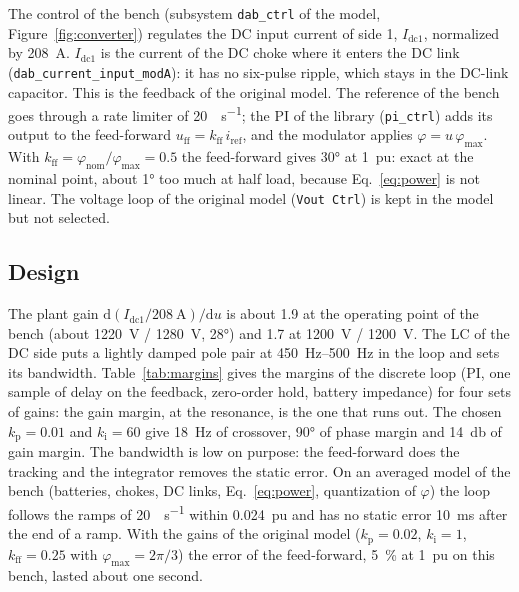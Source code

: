 \documentclass[12pt,a4paper]{scrartcl}
\newcommand{\ped}[1]{_{\mathrm{#1}}}
\newcommand{\code}[1]{\texttt{#1}}
\begin{document}
\begin{onehalfspace}
The control of the bench (subsystem \code{dab\_ctrl} of the model, Figure~\ref{fig:converter}) regulates the DC input current of side 1, $I\ped{dc1}$, normalized by \SI{208}{\ampere}. $I\ped{dc1}$ is the current of the DC choke where it enters the DC link (\code{dab\_current\_input\_modA}): it has no six-pulse ripple, which stays in the DC-link capacitor. This is the feedback of the original model. The reference of the bench goes through a rate limiter of \SI{20}{\pu\per\second}; the PI of the library (\code{pi\_ctrl}) adds its output to the feed-forward $u\ped{ff} = k\ped{ff}\,i\ped{ref}$, and the modulator applies $\varphi = u\,\varphi\ped{max}$. With $k\ped{ff} = \varphi\ped{nom}/\varphi\ped{max} = 0.5$ the feed-forward gives \ang{30} at \SI{1}{pu}: exact at the nominal point, about \ang{1} too much at half load, because Eq.~\eqref{eq:power} is not linear. The voltage loop of the original model (\code{Vout Ctrl}) is kept in the model but not selected.

\subsection{Design}
\label{sec:ctrl_design}

The plant gain $\mathrm{d}(I\ped{dc1}/\SI{208}{\ampere})/\mathrm{d}u$ is about 1.9 at the operating point of the bench (about \SI{1220}{\volt} / \SI{1280}{\volt}, \ang{28}) and 1.7 at \SI{1200}{\volt} / \SI{1200}{\volt}. The LC of the DC side puts a lightly damped pole pair at \SIrange{450}{500}{\hertz} in the loop and sets its bandwidth. Table~\ref{tab:margins} gives the margins of the discrete loop (PI, one sample of delay on the feedback, zero-order hold, battery impedance) for four sets of gains: the gain margin, at the resonance, is the one that runs out. The chosen $k\ped{p} = 0.01$ and $k\ped{i} = 60$ give \SI{18}{\hertz} of crossover, \ang{90} of phase margin and \SI{14}{\decibel} of gain margin. The bandwidth is low on purpose: the feed-forward does the tracking and the integrator removes the static error. On an averaged model of the bench (batteries, chokes, DC links, Eq.~\eqref{eq:power}, quantization of $\varphi$) the loop follows the ramps of \SI{20}{\pu\per\second} within \SI{0.024}{pu} and has no static error \SI{10}{\milli\second} after the end of a ramp. With the gains of the original model ($k\ped{p} = 0.02$, $k\ped{i} = 1$, $k\ped{ff} = 0.25$ with $\varphi\ped{max} = 2\pi/3$) the error of the feed-forward, \SI{5}{\percent} at \SI{1}{pu} on this bench, lasted about one second.


\end{onehalfspace}
\end{document}

